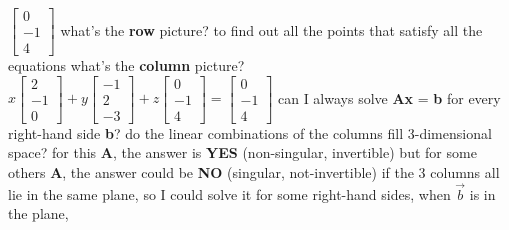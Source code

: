\documentclass[12pt, a4paper]{article}
\begin{document}
\begin{math} 
\begin{bmatrix}
	0 \\
	-1\\
	4
\end{bmatrix}
\end{math}
\vspace{14pt}
\newline
what's the {\textcolor{anhao-scarlet}{\bf{row}}} picture?
\newline
{\textcolor{anhao-purple}{to find out all the points that satisfy all the equations}}
\newline
what's the {\textcolor{anhao-scarlet}{\bf{column}}} picture?
\newline
\begin{math}
x
\begin{bmatrix}
	2 \\
	-1\\
	0
\end{bmatrix}
 + y
\begin{bmatrix}
	-1 \\
	2\\
	-3
\end{bmatrix}
 + z
\begin{bmatrix}
	0 \\
	-1\\
	4
\end{bmatrix}
 = 
\begin{bmatrix}
	0 \\
	-1\\
	4
\end{bmatrix}
\end{math}
\vspace{14pt}
\newline
can I always solve {\bf{A}}{\bf{x}} = {\bf{b}} for every right-hand side {\bf{b}}?
\newline
do the linear combinations of the columns fill 3-dimensional space?
\newline
{\textcolor{anhao-purple}{for this {\bf{A}}, the answer is {\bf{YES}} (non-singular, invertible)}}
\newline
{\textcolor{anhao-purple}{but for some others {\bf{A}}, the answer could be {\bf{NO}} (singular, not-invertible)}}
\vspace{14pt}
\newline
if the 3 columns all lie in the same plane, 
\newline
so I could solve it for some right-hand sides, when ${\overrightarrow{b}}$ is in the plane,
\end{document}
